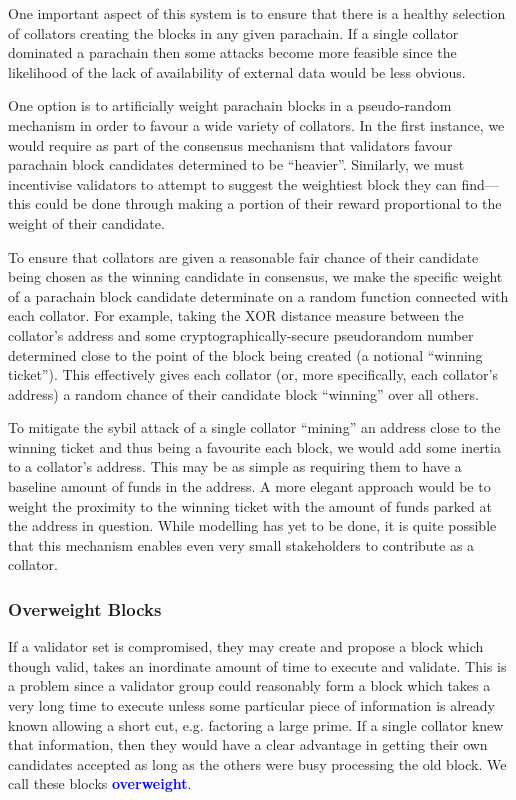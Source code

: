 \documentclass[t,usepdftitle=false]{beamer}
\makeatletter
\newcommand*\eg{e.g.\@\xspace}
\renewcommand{\textit}[1]{\textcolor{blue}{\textbf{#1}}}
\makeatother
\begin{document}
\begin{frame}
 One important aspect of this system is to ensure that there is a healthy selection of collators creating the blocks in any given parachain. If a single collator dominated a parachain then some attacks become more feasible since the likelihood of the lack of availability of external data would be less obvious.

 One option is to artificially weight parachain blocks in a pseudo-random mechanism in order to favour a wide variety of collators. In the first instance, we would require as part of the consensus mechanism that validators favour parachain block candidates determined to be ``heavier''. Similarly, we must incentivise validators to attempt to suggest the weightiest block they can find---this could be done through making a portion of their reward proportional to the weight of their candidate.

 To ensure that collators are given a reasonable fair chance of their candidate being chosen as the winning candidate in consensus, we make the specific weight of a parachain block candidate determinate on a random function connected
with each collator. For example, taking the {\small XOR} distance measure between the collator's address and some cryptographically-secure pseudorandom number determined close to the point of the block being created (a notional ``winning ticket''). This effectively gives each collator (or, more specifically, each collator's address) a random chance of their candidate block ``winning'' over all others.

 To mitigate the sybil attack of a single collator ``mining'' an address close to the winning ticket and thus being a favourite each block, we would add some inertia to a collator's address. This may be as simple as requiring them to have a baseline amount of funds in the address. A more elegant approach would be to weight the proximity to the winning ticket with the amount of funds parked at the address in question. While modelling has yet to be done, it is quite possible that this mechanism enables even very small stakeholders to contribute as a collator.
 
 \subsubsection{Overweight Blocks}
 
If a validator set is compromised, they may create and propose a block which though valid, takes an inordinate amount of time to execute and validate. This is a problem since a validator group could reasonably form a block which takes a very long time to execute unless some particular piece of information is already known allowing a short cut, \eg factoring a large prime. If a single collator knew that information, then they would have a clear advantage in getting their own candidates accepted as long as the others were busy processing the old block. We call these blocks \textit{overweight}.


\end{frame}
\end{document}
